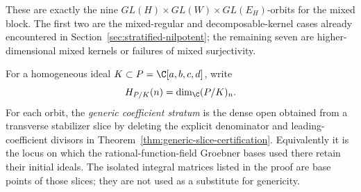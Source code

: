 These are exactly the nine
\(GL(H)\times GL(W)\times GL(E_H)\)-orbits for the mixed block.  The
first two are the mixed-regular and decomposable-kernel cases already
encountered in Section~\ref{sec:stratified-nilpotent}; the remaining
seven are higher-dimensional mixed kernels or failures of mixed
surjectivity.

For a homogeneous ideal \(K\subset
P=\C[a,b,c,d]\), write
\[
 H_{P/K}(n)=\dim_\C(P/K)_n.
\]
For each orbit, the \emph{generic coefficient stratum} is the dense
open obtained from a transverse stabilizer slice by deleting the
explicit denominator and leading-coefficient divisors in
Theorem~\ref{thm:generic-slice-certification}.  Equivalently it is
the locus on which the rational-function-field Groebner bases used
there retain their initial ideals.  The isolated integral matrices
listed in the proof are base points of those slices; they are not used
as a substitute for genericity.

